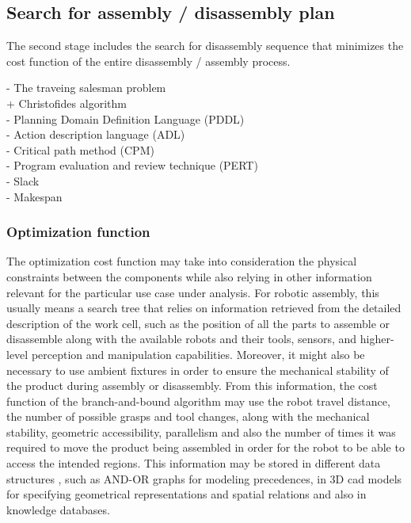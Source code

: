 


\subsection{Search for assembly / disassembly plan}

The second stage includes the search for disassembly sequence that minimizes the cost function of the entire disassembly / assembly process.

- The traveing salesman problem\\
	+ Christofides algorithm\\
- Planning Domain Definition Language (PDDL)\\
- Action description language (ADL)\\
- Critical path method (CPM)\\
- Program evaluation and review technique (PERT)\\
- Slack\\
- Makespan\\



\subsubsection{Optimization function}

The optimization cost function may take into consideration the physical constraints between the components while also relying in other information relevant for the particular use case under analysis. For robotic assembly, this usually means a search tree that relies on information retrieved from the detailed description of the work cell, such as the position of all the parts to assemble or disassemble along with the available robots and their tools, sensors, and higher-level perception and manipulation capabilities. Moreover, it might also be necessary to use ambient fixtures in order to ensure the mechanical stability of the product during assembly or disassembly. From this information, the cost function of the branch-and-bound algorithm may use the robot travel distance, the number of possible grasps and tool changes, along with the mechanical stability, geometric accessibility, parallelism and also the number of times it was required to move the product being assembled in order for the robot to be able to access the intended regions. This information may be stored in different data structures \cite{Thomas2001}, such as AND-OR graphs for modeling precedences, in 3D \gls{cad} models for specifying geometrical representations and spatial relations and also in knowledge databases.

